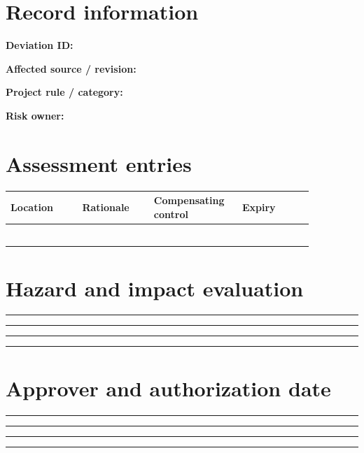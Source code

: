 \documentclass[10pt,letterpaper]{article}
\begin{document}
\makedoctitle
\makedocsummary
\section{Record information}
\noindent\textbf{Deviation ID:}\quad\hrulefill\par\vspace{11pt}
\noindent\textbf{Affected source / revision:}\quad\hrulefill\par\vspace{11pt}
\noindent\textbf{Project rule / category:}\quad\hrulefill\par\vspace{11pt}
\noindent\textbf{Risk owner:}\quad\hrulefill\par\vspace{11pt}
\section{Assessment entries}
\begin{longtable}{|p{0.215\linewidth}|p{0.215\linewidth}|p{0.215\linewidth}|p{0.215\linewidth}|}
\hline
\textbf{Location} & \textbf{Rationale} & \textbf{Compensating control} & \textbf{Expiry}\\\hline
\endhead
\rule{0pt}{27pt} & & & \\\hline
\rule{0pt}{27pt} & & & \\\hline
\rule{0pt}{27pt} & & & \\\hline
\rule{0pt}{27pt} & & & \\\hline
\rule{0pt}{27pt} & & & \\\hline
\rule{0pt}{27pt} & & & \\\hline
\end{longtable}
\section{Hazard and impact evaluation}
\noindent\rule{\linewidth}{0.4pt}\par\vspace{16pt}
\noindent\rule{\linewidth}{0.4pt}\par\vspace{16pt}
\noindent\rule{\linewidth}{0.4pt}\par\vspace{16pt}
\noindent\rule{\linewidth}{0.4pt}\par\vspace{16pt}
\section{Approver and authorization date}
\noindent\rule{\linewidth}{0.4pt}\par\vspace{16pt}
\noindent\rule{\linewidth}{0.4pt}\par\vspace{16pt}
\noindent\rule{\linewidth}{0.4pt}\par\vspace{16pt}
\noindent\rule{\linewidth}{0.4pt}\par\vspace{16pt}
\end{document}

